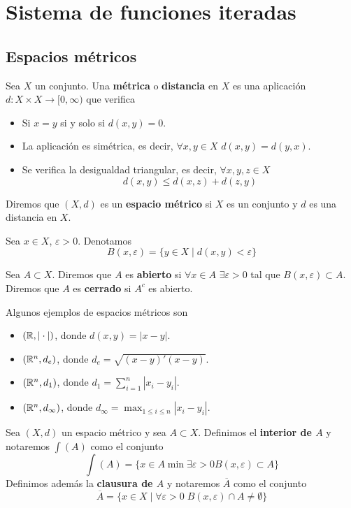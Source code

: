 \documentclass[FyPI.tex]{subfiles}
\begin{document}
\chapter{Sistema de funciones iteradas}
\section{Espacios métricos}
\begin{defi}
Sea $X$ un conjunto. Una \textbf{métrica} o \textbf{distancia }en $X$ es una aplicación $d: X\times X \to [0,\infty)$ que verifica
\begin{itemize}
\item Si $x=y$ si y solo si $d(x,y)=0$.
\item La aplicación es simétrica, es decir, $\forall x,y\in X$ $d(x,y)=d(y,x)$.
\item Se verifica la desigualdad triangular, es decir, $\forall x,y,z \in X$ 
$$
d(x,y)\leq d(x,z)+d(z,y)
$$
\end{itemize}
\end{defi}
\begin{defi}
Diremos que $(X,d)$ es un \textbf{espacio métrico} si $X$ es un conjunto y $d$ es una distancia en $X$.
\end{defi}
\begin{nota}
Sea $x\in X$, $\varepsilon >0$. Denotamos
$$
B(x,\varepsilon) = \{y \in X \mid d(x,y)<\varepsilon\}
$$
\end{nota}
\begin{defi}
Sea $A\subset X$. Diremos que $A$ es \textbf{abierto} si $\forall x \in A$ $\exists \varepsilon>0$ tal que $B(x,\varepsilon)\subset A$. Diremos que $A$ es \textbf{cerrado} si $A^c$ es abierto.
\end{defi}
\begin{example}
Algunos ejemplos de espacios métricos son 
\begin{itemize}
\item $(\mathbb{R},|\cdot|)$, donde $d(x,y)=|x-y|$.
\item $(\mathbb{R}^n,d_e)$, donde $d_e = \sqrt{(x-y)'(x-y)}$.
\item $(\mathbb{R}^n,d_1)$, donde $d_1 = \sum_{i=1}^n |x_i-y_i|$.
\item $(\mathbb{R}^n,d_\infty)$, donde $d_\infty = \max_{1\leq i \leq n} |x_i-y_i|$.
\end{itemize}
\end{example}
\begin{defi}
Sea $(X,d)$ un espacio métrico y sea $A\subset X$. Definimos el \textbf{interior de $A$} y notaremos $\int(A)$ como el conjunto
$$
\int(A) = \{x\in A \min \exists \varepsilon >0 B(x,\varepsilon)\subset A\}
$$
Definimos además la \textbf{clausura de $A$} y notaremos $\overline{A}$ como el conjunto
$$
\overline{A} = \{ x\in X \mid \forall \varepsilon > 0 \; B(x,\varepsilon)\cap A \neq \emptyset\}
$$
\end{defi}
\end{document}
